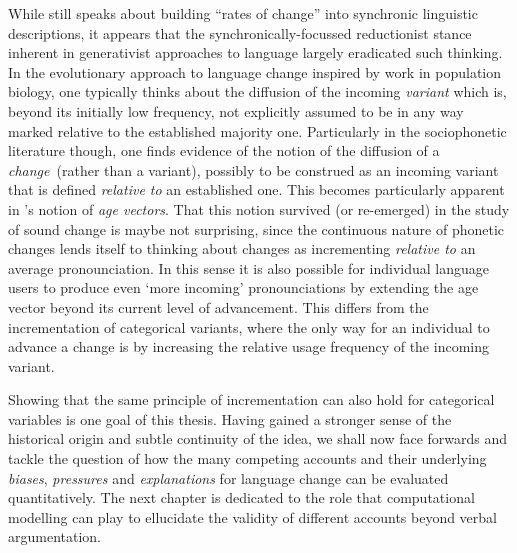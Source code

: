 While \citet{Bailey1970} still speaks about building ``rates of change'' into synchronic linguistic descriptions, it appears that the synchronically-focussed reductionist stance inherent in generativist approaches to language largely eradicated such thinking.
In the evolutionary approach to language change inspired by work in population biology, one typically thinks about the diffusion of the incoming \emph{variant} which is, beyond its initially low frequency, not explicitly assumed to be in any way marked relative to the established majority one.
Particularly in the sociophonetic literature though, one finds evidence of the notion of the diffusion of a \emph{change}~(rather than a variant), possibly to be construed as an incoming variant that is defined \emph{relative to} an established one. This becomes particularly apparent in \citet{Labov2001}'s notion of \emph{age vectors}. 
That this notion survived (or re-emerged) in the study of sound change is maybe not surprising, since the continuous nature of phonetic changes lends itself to thinking about changes as incrementing \emph{relative to} an average pronounciation. In this sense it is also possible for individual language users to produce even `more incoming' pronounciations by extending the age vector beyond its current level of advancement. This differs from the incrementation of categorical variants, where the only way for an individual to advance a change is by increasing the relative usage frequency of the incoming variant.

Showing that the same principle of incrementation can also hold for categorical variables is one goal of this thesis. Having gained a stronger sense of the historical origin and subtle continuity of the idea, we shall now face forwards and tackle the question of how the many competing accounts and their underlying \emph{biases}, \emph{pressures} and \emph{explanations} for language change can be evaluated quantitatively.
The next chapter is dedicated to the role that computational modelling can play to ellucidate the validity of different accounts beyond verbal argumentation.%


